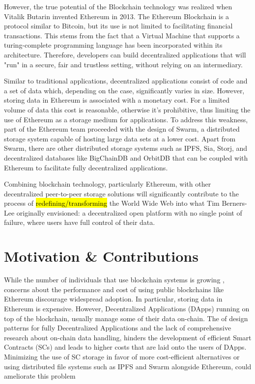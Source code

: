 However, the true potential of the Blockchain technology was realized when Vitalik Butarin invented Ethereum in 2013. The Ethereum Blockchain is a protocol similar to Bitcoin, but its use is not limited to facilitating financial transactions. This stems from the fact that a Virtual Machine that supports a turing-complete programming language has been incorporated within its architecture. Therefore, developers can build decentralized applications that will "run" in a secure, fair and trustless setting, without relying on an intermediary. 

Similar to traditional applications, decentralized applications consist of code and a set of data which, depending on the case, significantly varies in size. However, storing data in Ethereum is associated with a monetary cost. For a limited volume of data this cost is reasonable, otherwise it's prohibitive, thus limiting the use of Ethereum as a storage medium for applications. To address this weakness, part of the Ethereum team proceeded with the design of Swarm, a distributed storage system capable of hosting large data sets at a lower cost. Apart from Swarm, there are other distributed storage systems such as IPFS, Sia, Storj, and decentralized databases like BigChainDB and OrbitDB that can be coupled with Ethereum to facilitate fully decentralized applications. 

Combining blockchain technology, particularly Ethereum, with other decentralized peer-to-peer storage solutions will significantly contribute to the process of \hl{redefining/transforming} the World Wide Web into what Tim Berners-Lee originally envisioned: a decentralized open platform with no single point of failure, where users have full control of their data. 

\section{Motivation \& Contributions}\label{sec:}
While the number of individuals that use blockchain systems is growing , concerns about the performance and cost of using public blockchains like Ethereum \citep{buterin_2014} discourage widespread adoption. In particular, storing data in Ethereum is expensive. However, Decentralized Applications (DApps) running on top of the blockchain, usually manage some of their data on-chain. The  of design patterns for fully Decentralized Applications \citep{wohrer_2021} and the lack of comprehensive research about on-chain data handling, hinders the development of efficient Smart Contracts (SCs) and leads to higher costs that are laid onto the users of DApps. Minimizing the use of SC storage in favor of more cost-efficient alternatives or using distributed file systems such as IPFS \citep{benet_2014} and Swarm \citep{tron_2020} alongside Ethereum, could ameliorate this problem 


